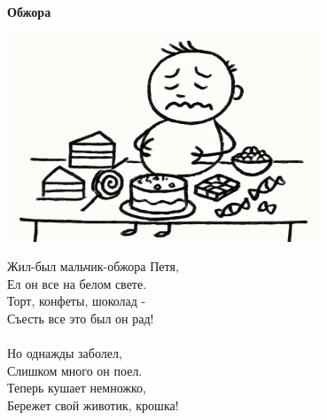\vspace*{\fill}
\begin{center}
  {\huge\textbf{Обжора}}

  \vspace{1.5em}  \includegraphics[width=0.7\textwidth]{pictures/obzhora.png}
  \vspace{4em}
  \parbox{0.6\textwidth}{
    \LARGE
    \begin{spacing}{1.2}
      Жил-был мальчик-обжора Петя,\\
      Ел он все на белом свете.\\
      Торт, конфеты, шоколад -\\
      Съесть все это был он рад!\\
      \\
      Но однажды заболел,\\
      Слишком много он поел.\\
      Теперь кушает немножко,\\
      Бережет свой животик, крошка! %
    \end{spacing}
      
  }
\end{center}
\vspace*{\fill}